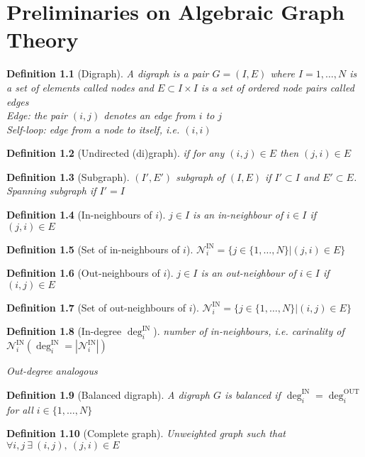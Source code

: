 \documentclass{book}
\theoremstyle{theoremv2}
\theoremstyle{defv2}
\newtheorem{definition}{Definition}[chapter]
\theoremstyle{remark}
\theoremstyle{remark}
\theoremstyle{definition}
\theoremstyle{definition}
\begin{document}
\chapter{Preliminaries on Algebraic Graph Theory}
\begin{definition}[Digraph]
    A digraph is a pair $G=(I,E)$ where $I={1,\dots,N}$ is a set of elements called \emph{nodes} and $E\subset I \times I$ is a set of ordered node pairs called \emph{edges}\\
    \emph{Edge}: the pair $(i,j)$ denotes an edge from $i$ to $j$\\ 
    \emph{Self-loop}: edge from a node to itself, i.e. $(i,i)$
\end{definition}
\begin{definition}[Undirected (di)graph]
    if for any $(i,j)\in E$ then $(j,i)\in E$  
\end{definition}
\begin{definition}[Subgraph]
    $(I',E')$ subgraph of $(I,E)$ if $I'\subset I$ and $E' \subset E$. Spanning subgraph if $I'=I$
\end{definition}
\begin{definition}[In-neighbours of $i$]$j\in I$ is an in-neighbour of $i\in I$ if $(j,i)\in E$
\end{definition}
\begin{definition}[Set of in-neighbours of $i$]
    $\mathcal{N}_i^{\text{IN}}=\{j\in\{1,\dots,N\}|(j,i)\in E\}$
\end{definition}
\begin{definition}[Out-neighbours of $i$]$j\in I$ is an out-neighbour of $i\in I$ if $(i,j)\in E$
\end{definition}
\begin{definition}[Set of out-neighbours of $i$]
    $\mathcal{N}_i^{\text{IN}}=\{j\in\{1,\dots,N\}|(i,j)\in E\}$
\end{definition}
\begin{definition}[In-degree $\deg_i^{\text{IN}}$]
    number of in-neighbours, i.e. carinality of $\mathcal{N}_i^{\text{IN}}(\deg_i^{\text{IN}}=|\mathcal{N}_i^{\text{IN}}|)$

    Out-degree analogous
\end{definition}
\begin{definition}[Balanced digraph]
    A digraph $G$ is balanced if $\deg_i^{\text{IN}}=\deg_i^{\text{OUT}}$ for all $i\in\{1,\dots,N\}$
\end{definition}

\begin{definition}[Complete graph]
    Unweighted graph such that $\forall i,j\ \exists \ (i,j),\ (j,i) \in E$
\end{definition}
\end{document}
